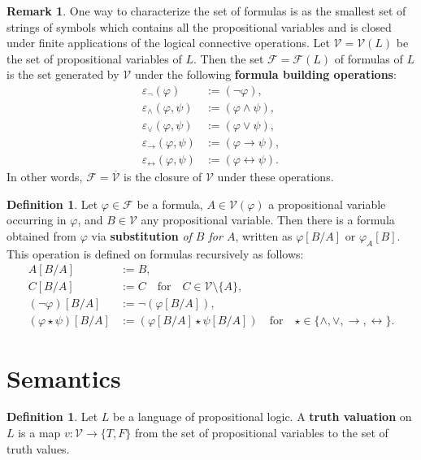 \documentclass[12pt]{article}
\theoremstyle{definition}
\newtheorem{definition}[theorem]{Definition}
\newtheorem{remark}[theorem]{Remark}
\newcommand{\isp}[1]{\quad\text{#1}\quad}
\newcommand{\eps}{\varepsilon}
\renewcommand{\phi}{\varphi}
\newcommand{\<}{\langle}
\renewcommand{\>}{\rangle}
\newcommand{\clo}{\overline}
\newcommand{\FF}{\mathcal{F}}
\newcommand{\VV}{\mathcal{V}}
\newcommand{\keyword}{\textbf}
\newcommand{\liff}{\leftrightarrow}
\begin{document}
\begin{remark}
    One way to characterize the set of formulas is as the smallest set of strings of symbols which contains all the propositional variables and is closed under finite applications of the logical connective operations.
    Let $\VV = \VV(L)$ be the set of propositional variables of $L$.
    Then the set $\FF = \FF(L)$ of formulas of $L$ is the set generated by $\VV$ under the following \keyword{formula building operations}:
    \begin{align*}
        \eps_\lnot(\phi) &:= (\lnot \phi), \\
        \eps_\land(\phi, \psi) &:= (\phi \land \psi), \\
        \eps_\lor(\phi, \psi) &:= (\phi \lor \psi), \\
        \eps_\to(\phi, \psi) &:= (\phi \to \psi), \\
        \eps_\liff(\phi, \psi) &:= (\phi \liff \psi).
    \end{align*}
    In other words, $\FF = \clo{\VV}$ is the closure of $\VV$ under these operations. 
\end{remark}

\begin{definition}
    Let $\phi \in \FF$ be a formula, $A \in \VV(\phi)$ a propositional variable occurring in $\phi$, and $B \in \VV$ any propositional variable.
    Then there is a formula obtained from $\phi$ via \keyword{substitution} \emph{of $B$ for $A$}, written as $\phi[B/A]$ or $\phi_A[B]$.
    This operation is defined on formulas recursively as follows:
    \begin{align*}
        A[B/A] &:= B, \\
        C[B/A] &:= C \isp{for} C \in \VV \setminus \{A\}, \\
        (\lnot \phi)[B/A] &:= \lnot(\phi[B/A]), \\
        (\phi \star \psi)[B/A] &:= (\phi[B/A] \star \psi[B/A]) \isp{for} \star \in \{\land, \lor, \to, \liff\}.
    \end{align*}
\end{definition}

\section{Semantics}

\begin{definition}
    Let $L$ be a language of propositional logic.
    A \keyword{truth valuation} on $L$ is a map $v : \VV \to \{T, F\}$ from the set of propositional variables to the set of truth values.
\end{definition}
\end{document}
